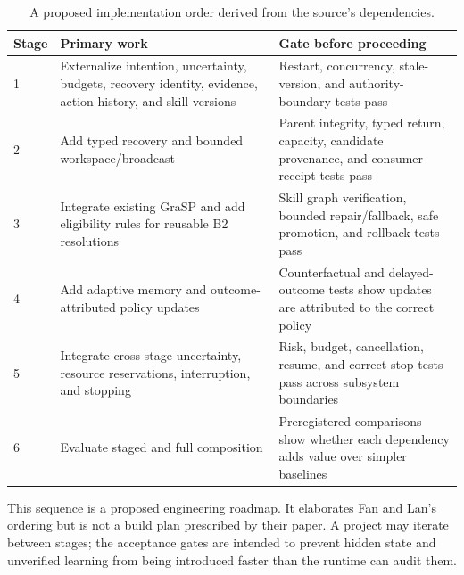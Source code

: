 \begin{table}[htbp]
\centering
\small
\caption{A proposed implementation order derived from the source's dependencies.}
\label{tab:ch18-stage-gates}
\begin{tabularx}{\linewidth}{p{1.0cm}p{3.2cm}X}
\toprule
\textbf{Stage} & \textbf{Primary work} & \textbf{Gate before proceeding} \\
\midrule
1 & Externalize intention, uncertainty, budgets, recovery identity, evidence, action history, and skill versions & Restart, concurrency, stale-version, and authority-boundary tests pass \\
2 & Add typed recovery and bounded workspace/broadcast & Parent integrity, typed return, capacity, candidate provenance, and consumer-receipt tests pass \\
3 & Integrate existing GraSP and add eligibility rules for reusable B2 resolutions & Skill graph verification, bounded repair/fallback, safe promotion, and rollback tests pass \\
4 & Add adaptive memory and outcome-attributed policy updates & Counterfactual and delayed-outcome tests show updates are attributed to the correct policy \\
5 & Integrate cross-stage uncertainty, resource reservations, interruption, and stopping & Risk, budget, cancellation, resume, and correct-stop tests pass across subsystem boundaries \\
6 & Evaluate staged and full composition & Preregistered comparisons show whether each dependency adds value over simpler baselines \\
\bottomrule
\end{tabularx}
\end{table}

This sequence is a proposed engineering roadmap. It elaborates Fan and Lan's ordering but is not a build plan prescribed by their paper. A project may iterate between stages; the acceptance gates are intended to prevent hidden state and unverified learning from being introduced faster than the runtime can audit them.


